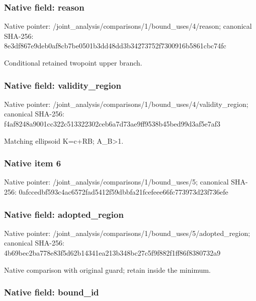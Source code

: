 \documentclass[10pt,a4paper]{article}
\begin{document}
\subsubsection{Native field: reason}


Native pointer: /joint\_analysis/comparis\allowbreak{}ons/1/bound\_uses/4/reaso\allowbreak{}n; canonical SHA-256: 8e3df867e9deb0af8cb7be05\allowbreak{}01b3dd48dd3b34273752f730\allowbreak{}0916b5861cbc74fc


Conditional retained twopoint upper branch.


\subsubsection{Native field: validity\_region}


Native pointer: /joint\_analysis/comparis\allowbreak{}ons/1/bound\_uses/4/valid\allowbreak{}ity\_region; canonical SHA-256: f4af8248a9001cc322c51332\allowbreak{}2302ceb6a7d73ae9ff9538b4\allowbreak{}5bed99d3af5e7af3


Matching ellipsoid K=c+RB; A\_B>1.


\subsubsection{Native item 6}


Native pointer: /joint\_analysis/comparis\allowbreak{}ons/1/bound\_uses/5; canonical SHA-256: 0afccedbf593c4ac6572fad5\allowbreak{}412f59dbbfa21fcefeee66fc\allowbreak{}773973d23f736efe



\subsubsection{Native field: adopted\_region}


Native pointer: /joint\_analysis/comparis\allowbreak{}ons/1/bound\_uses/5/adopt\allowbreak{}ed\_region; canonical SHA-256: 4b69bec2ba778e83f5d62b14\allowbreak{}341ea213b348bc27c5f9f882\allowbreak{}f1ff86f8380732a9


Native comparison with original guard; retain inside the minimum.


\subsubsection{Native field: bound\_id}
\end{document}
